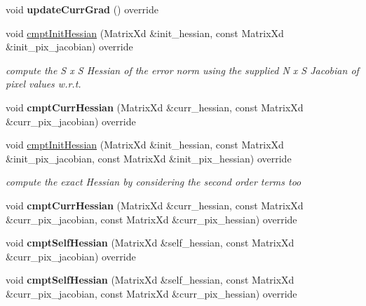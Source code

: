 \begin{DoxyCompactItemize}
\item 
\hypertarget{classSSIM_a05570d527eff147c69bae19e3e22d183}{void {\bfseries update\-Curr\-Grad} () override}\label{classSSIM_a05570d527eff147c69bae19e3e22d183}

\item 
void \hyperlink{classSSIM_aa0b9be88f69682cabbda79b485b55035}{cmpt\-Init\-Hessian} (Matrix\-Xd \&init\-\_\-hessian, const Matrix\-Xd \&init\-\_\-pix\-\_\-jacobian) override
\begin{DoxyCompactList}\small\item\em compute the S x S Hessian of the error norm using the supplied N x S Jacobian of pixel values w.\-r.\-t. \end{DoxyCompactList}\item 
\hypertarget{classSSIM_a89c0e4d1de565a24e91c427610227153}{void {\bfseries cmpt\-Curr\-Hessian} (Matrix\-Xd \&curr\-\_\-hessian, const Matrix\-Xd \&curr\-\_\-pix\-\_\-jacobian) override}\label{classSSIM_a89c0e4d1de565a24e91c427610227153}

\item 
\hypertarget{classSSIM_a2c424389315d9edee28e69b123e84acb}{void \hyperlink{classSSIM_a2c424389315d9edee28e69b123e84acb}{cmpt\-Init\-Hessian} (Matrix\-Xd \&init\-\_\-hessian, const Matrix\-Xd \&init\-\_\-pix\-\_\-jacobian, const Matrix\-Xd \&init\-\_\-pix\-\_\-hessian) override}\label{classSSIM_a2c424389315d9edee28e69b123e84acb}

\begin{DoxyCompactList}\small\item\em compute the exact Hessian by considering the second order terms too \end{DoxyCompactList}\item 
\hypertarget{classSSIM_ae7a2914fd255f773227d6f44a5b111ea}{void {\bfseries cmpt\-Curr\-Hessian} (Matrix\-Xd \&curr\-\_\-hessian, const Matrix\-Xd \&curr\-\_\-pix\-\_\-jacobian, const Matrix\-Xd \&curr\-\_\-pix\-\_\-hessian) override}\label{classSSIM_ae7a2914fd255f773227d6f44a5b111ea}

\item 
\hypertarget{classSSIM_ab82d0b08bfe9811551feeb75dacd9d58}{void {\bfseries cmpt\-Self\-Hessian} (Matrix\-Xd \&self\-\_\-hessian, const Matrix\-Xd \&curr\-\_\-pix\-\_\-jacobian) override}\label{classSSIM_ab82d0b08bfe9811551feeb75dacd9d58}

\item 
\hypertarget{classSSIM_a3d61a56037d4da4ca793c284436ab7bc}{void {\bfseries cmpt\-Self\-Hessian} (Matrix\-Xd \&self\-\_\-hessian, const Matrix\-Xd \&curr\-\_\-pix\-\_\-jacobian, const Matrix\-Xd \&curr\-\_\-pix\-\_\-hessian) override}\label{classSSIM_a3d61a56037d4da4ca793c284436ab7bc}


\end{DoxyCompactItemize}
